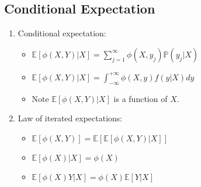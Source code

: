 \documentclass[%
 aip,
 jmp,%
 amsmath,amssymb,
 reprint,%
]{revtex4-1}
\def\P{\mathbb{P}}
\def\E{\mathbb{E}}
\begin{document}
\subsection{Conditional Expectation}
\begin{enumerate}
    \item Conditional expectation:
        \begin{itemize}
            \item $\E[\phi(X,Y)|X] = \sum_{j=1}^{\infty} \phi(X,y_j)\P(y_j|X)$
            \item $\E[\phi(X,Y)|X] = \int_{-\infty}^{+\infty} \phi(X,y)f(y|X)dy$
            \item Note $\E[\phi(X,Y)|X]$ is a function of $X$.
        \end{itemize}

    \item Law of iterated expectations:
        \begin{itemize}
            \item $\E[\phi(X,Y)] = \E[\E[\phi(X,Y)|X]]$
            \item $\E[\phi(X)|X] = \phi(X)$
            \item $\E[\phi(X)Y|X] = \phi(X)\E[Y|X]$
        \end{itemize}

\end{enumerate}
\end{document}
